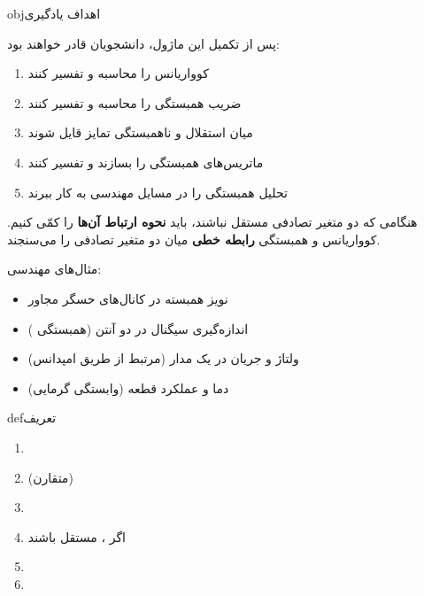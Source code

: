 \begin{PSbox}[unbreakable]{obj}{اهداف یادگیری}

پس از تکمیل این ماژول، دانشجویان قادر خواهند بود:

\begin{enumerate}
\def\labelenumi{\arabic{enumi}.}
\tightlist
\item
  کوواریانس را محاسبه و تفسیر کنند
\item
  ضریب همبستگی را محاسبه و تفسیر کنند
\item
  میان استقلال و ناهمبستگی تمایز قایل شوند
\item
  ماتریس‌های همبستگی را بسازند و تفسیر کنند
\item
  تحلیل همبستگی را در مسایل مهندسی به کار ببرند
\end{enumerate}

\end{PSbox}


هنگامی که دو متغیر تصادفی مستقل نباشند، باید \textbf{نحوه ارتباط آن‌ها} را کمّی کنیم. کوواریانس و همبستگی \textbf{رابطه خطی} میان دو متغیر تصادفی را می‌سنجند.

مثال‌های مهندسی:

\begin{itemize}
\tightlist
\item
  نویز همبسته در کانال‌های حسگر مجاور
\item
  اندازه‌گیری سیگنال در دو آنتن (همبستگی )
\item
  ولتاژ و جریان در یک مدار (مرتبط از طریق امپدانس)
\item
  دما و عملکرد قطعه (وابستگی گرمایی)
\end{itemize}


\begin{PSbox}[unbreakable]{def}{تعریف}


\end{PSbox}


\begin{enumerate}
\def\labelenumi{\arabic{enumi}.}
\tightlist
\item
\item
   (متقارن)
\item
\item
  اگر ،  مستقل باشند 
\item
\item
\end{enumerate}

